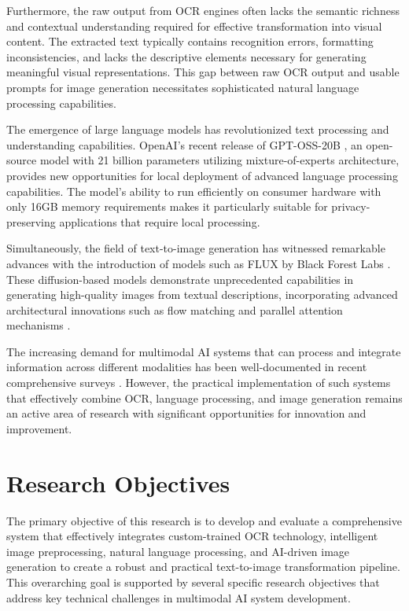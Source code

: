 Furthermore, the raw output from OCR engines often lacks the semantic richness and contextual understanding required for effective transformation into visual content. The extracted text typically contains recognition errors, formatting inconsistencies, and lacks the descriptive elements necessary for generating meaningful visual representations. This gap between raw OCR output and usable prompts for image generation necessitates sophisticated natural language processing capabilities.

The emergence of large language models has revolutionized text processing and understanding capabilities. OpenAI's recent release of GPT-OSS-20B \cite{openai2025gptoss}, an open-source model with 21 billion parameters utilizing mixture-of-experts architecture, provides new opportunities for local deployment of advanced language processing capabilities. The model's ability to run efficiently on consumer hardware with only 16GB memory requirements makes it particularly suitable for privacy-preserving applications that require local processing.

Simultaneously, the field of text-to-image generation has witnessed remarkable advances with the introduction of models such as FLUX by Black Forest Labs \cite{blackforestlabs2024flux}. These diffusion-based models demonstrate unprecedented capabilities in generating high-quality images from textual descriptions, incorporating advanced architectural innovations such as flow matching and parallel attention mechanisms \cite{rombach2025flux}.

The increasing demand for multimodal AI systems that can process and integrate information across different modalities has been well-documented in recent comprehensive surveys \cite{qin2024comprehensive, jin2024mm}. However, the practical implementation of such systems that effectively combine OCR, language processing, and image generation remains an active area of research with significant opportunities for innovation and improvement.

\section{Research Objectives}

The primary objective of this research is to develop and evaluate a comprehensive system that effectively integrates custom-trained OCR technology, intelligent image preprocessing, natural language processing, and AI-driven image generation to create a robust and practical text-to-image transformation pipeline. This overarching goal is supported by several specific research objectives that address key technical challenges in multimodal AI system development.

